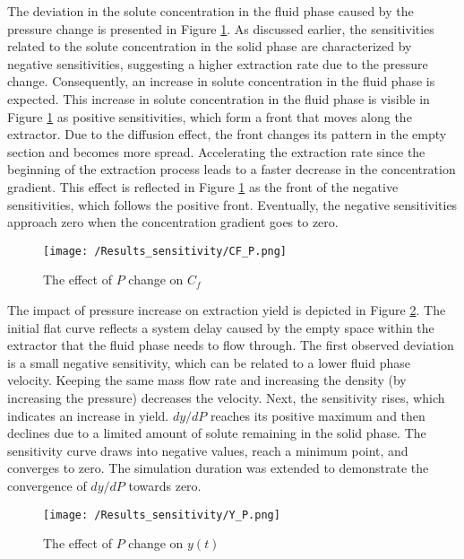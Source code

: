 \documentclass[../Article_Sensitivity_Analsysis.tex]{subfiles}
\begin{document}
	The deviation in the solute concentration in the fluid phase caused by the pressure change is presented in Figure \ref{fig:Sensitivty_P_CF}. As discussed earlier, the sensitivities related to the solute concentration in the solid phase are characterized by negative sensitivities, suggesting a higher extraction rate due to the pressure change. Consequently, an increase in solute concentration in the fluid phase is expected. This increase in solute concentration in the fluid phase is visible in Figure \ref{fig:Sensitivty_P_CF} as positive sensitivities, which form a front that moves along the extractor. Due to the diffusion effect, the front changes its pattern in the empty section and becomes more spread. Accelerating the extraction rate since the beginning of the extraction process leads to a faster decrease in the concentration gradient. This effect is reflected in Figure \ref{fig:Sensitivty_P_CF} as the front of the negative sensitivities, which follows the positive front. Eventually, the negative sensitivities approach zero when the concentration gradient goes to zero.

	\begin{figure}[h!]
		\centering
		\texttt{[image: /Results\_sensitivity/CF\_P.png]}
		\caption{The effect of $P$ change on $C_f$}
		\label{fig:Sensitivty_P_CF}
	\end{figure}

	The impact of pressure increase on extraction yield is depicted in Figure \ref{fig:Sensitivty_P_y}. The initial flat curve reflects a system delay caused by the empty space within the extractor that the fluid phase needs to flow through. The first observed deviation is a small negative sensitivity, which can be related to a lower fluid phase velocity. Keeping the same mass flow rate and increasing the density (by increasing the pressure) decreases the velocity. Next, the sensitivity rises, which indicates an increase in yield. $dy / dP$ reaches its positive maximum and then declines due to a limited amount of solute remaining in the solid phase. The sensitivity curve draws into negative values, reach a minimum point, and converges to zero. The simulation duration was extended to demonstrate the convergence of $dy / dP$ towards zero.

	\begin{figure}[h!]
		\centering
		\texttt{[image: /Results\_sensitivity/Y\_P.png]}
		\caption{The effect of $P$ change on $y(t)$}
		\label{fig:Sensitivty_P_y}
	\end{figure}
\end{document}
